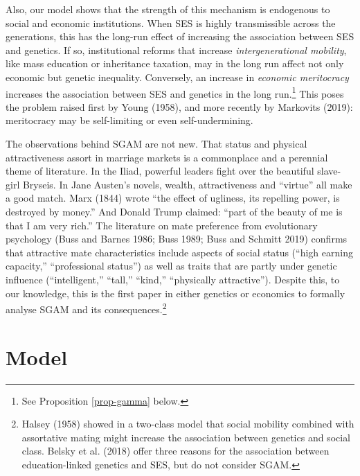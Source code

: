 \documentclass[
]{article}
\theoremstyle{definition}
\theoremstyle{definition}
\theoremstyle{definition}
\theoremstyle{definition}
\theoremstyle{remark}
\begin{document}
Also, our model shows that the strength of this mechanism is endogenous to
social and economic institutions. When SES is highly transmissible across the
generations, this has the long-run effect of increasing the association between
SES and genetics. If so, institutional reforms that increase \emph{intergenerational
mobility}, like mass education or inheritance taxation, may in the long run
affect not only economic but genetic inequality. Conversely, an increase in
\emph{economic meritocracy} increases the association between SES and genetics in the
long run.\footnote{See Proposition \ref{prop-gamma} below.} This poses the problem raised first by Young (1958), and more
recently by Markovits (2019): meritocracy may be self-limiting or even
self-undermining.

The observations behind SGAM are not new. That status and physical
attractiveness assort in marriage markets is a commonplace and a perennial theme
of literature. In the Iliad, powerful leaders fight over the beautiful
slave-girl Bryseis. In Jane Austen's novels, wealth, attractiveness and ``virtue''
all make a good match. Marx (1844) wrote ``the effect of ugliness, its repelling
power, is destroyed by money.'' And Donald Trump claimed: ``part of the beauty of
me is that I am very rich.'' The literature on mate preference from evolutionary
psychology (Buss and Barnes 1986; Buss 1989; Buss and Schmitt 2019) confirms
that attractive mate characteristics include aspects of social status (``high
earning capacity,'' ``professional status'') as well as traits that are partly
under genetic influence (``intelligent,'' ``tall,'' ``kind,'' ``physically
attractive''). Despite this, to our knowledge, this is the first paper in either
genetics or economics to formally analyse SGAM and its consequences.\footnote{Halsey (1958) showed in a two-class model that social
  mobility combined with assortative mating might increase the association between
  genetics and social class. Belsky et al. (2018) offer three reasons for the
  association between education-linked genetics and SES, but do not consider SGAM.}

\hypertarget{model}{%
\section{Model}\label{model}}
\end{document}
